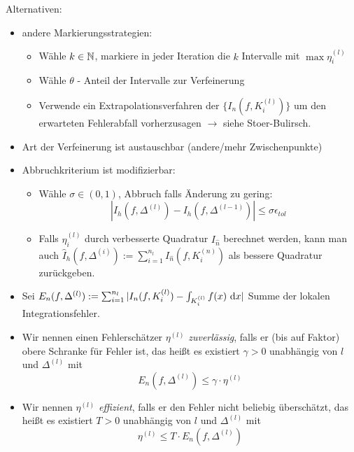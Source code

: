 \documentclass[
]{mycourse}
\begin{document}
\begin{note*}
	Alternativen:
	\begin{itemize}
		\item andere Markierungsstrategien:
			\begin{itemize}
				\item Wähle $k\in \mathbb{N}$, markiere in jeder Iteration die $k$ Intervalle mit $\max \eta_i^{(l)}$
				\item Wähle $\theta$ - Anteil der Intervalle zur Verfeinerung
				\item Verwende ein Extrapolationsverfahren der $\{I_n(f, K_i^{(l)})\}$ um den erwarteten Fehlerabfall vorherzusagen $\rightarrow$ siehe Stoer-Bulirsch.
		\end{itemize}
	\item Art der Verfeinerung ist austauschbar (andere/mehr Zwischenpunkte)
	\item Abbruchkriterium ist modifizierbar:
		\begin{itemize}
			\item Wähle $\sigma\in (0,1)$, Abbruch falls Änderung zu gering:
				\[
					|I_h(f,\Delta^{(l)})-I_{h}(f, \Delta^{(l-1)} )|\le \sigma \epsilon_{tol}
				\]
			\item Falls $\eta_i^{(l)}$ durch verbesserte Quadratur $I_{\hat n}$ berechnet werden, kann man auch $\hat I_h(f, \Delta^{(i)}):=\sum_{i=1}^{n_l} I_{\hat n} (f, K_i^{(n)})$ als bessere Quadratur zurückgeben.
		\end{itemize}
\end{itemize}
\end{note*}
\begin{note*}
	\begin{itemize}
		\item Sei $E_n(f, \Delta^{(l)}):= \sum_{i=1}^{n_l} |I_n(f,K_i^{(l)}) - \int_{K_i^{(l)}} f(x)\, \,\mathrm{d}x|$ Summe der lokalen Integrationsfehler.
		\item Wir nennen einen Fehlerschätzer $\eta^{(l)}$ \emph{zuverlässig}, falls er (bis auf Faktor) obere Schranke für Fehler ist, das heißt es existiert $\gamma >0$ unabhängig von $l$ und $\Delta^{(l)}$ mit 
			\[
				E_n(f, \Delta^{(l)})\le \gamma \cdot \eta^{(l)}
			\]
		\item Wir nennen $\eta^{(l)}$ \emph{effizient}, falls er den Fehler nicht beliebig überschätzt, das heißt es existiert $T>0$ unabhängig von $l$ und $\Delta^{(l)}$ mit 
			\[
				\eta^{(l)}\le T \cdot E_n(f, \Delta^{(l)})
			\]
	\end{itemize}
\end{note*}
\end{document}
